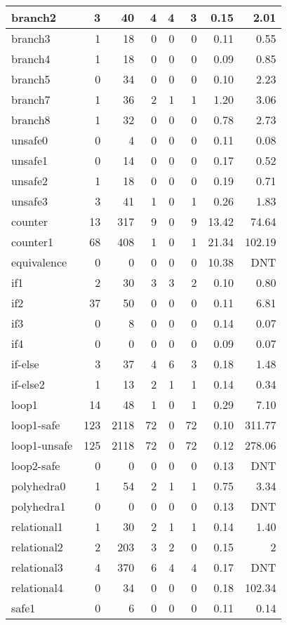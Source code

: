 \documentclass{article}
\begin{document}
\begin{table}[!b]
\begin{center}
{\begin{tabular}{l|r|r|r|r|r|r|r}
  branch2&3&40&4&4&3&0.15 & 2.01
  \\ \hline 
  branch3&1&18&0&0&0&0.11 & 0.55
  \\ \hline 
  branch4&1&18&0&0&0&0.09 & 0.85
  \\ \hline 
  branch5&0&34&0&0&0&0.10 & 2.23
  \\ \hline 
  branch7&1&36&2&1&1&1.20 & 3.06
  \\ \hline 
  branch8&1&32&0&0&0&0.78 & 2.73
  \\ \hline 
  unsafe0&0&4&0&0&0&0.11 & 0.08
  \\ \hline 
  unsafe1&0&14&0&0&0&0.17 & 0.52
  \\ \hline 
  unsafe2&1&18&0&0&0&0.19 & 0.71
  \\ \hline 
  unsafe3&3&41&1&0&1&0.26 & 1.83
  \\ \hline 
  counter&13&317&9&0&9&13.42 & 74.64
  \\ \hline 
  counter1&68&408&1&0&1&21.34 & 102.19
  \\ \hline 
  equivalence&0&0&0&0&0&10.38 & DNT
  \\ \hline 
  if1&2&30&3&3&2&0.10 & 0.80
  \\ \hline 
  if2&37&50&0&0&0&0.11 & 6.81
  \\ \hline 
  if3&0&8&0&0&0&0.14 & 0.07
  \\ \hline 
  if4&0&0&0&0&0&0.09 & 0.07
  \\ \hline 
  if-else&3&37&4&6&3& 0.18 & 1.48
  \\ \hline 
  if-else2&1&13&2&1&1& 0.14 & 0.34
  \\ \hline 
  loop1&14&48&1&0&1& 0.29  & 7.10
  \\ \hline 
  loop1-safe&123&2118&72&0&72& 0.10 & 311.77
  \\ \hline 
  loop1-unsafe&125&2118&72&0&72& 0.12 & 278.06
  \\ \hline 
  loop2-safe&0&0&0&0&0& 0.13 & DNT
  \\ \hline 
  polyhedra0&1&54&2&1&1& 0.75 & 3.34
  \\ \hline 
  polyhedra1&0&0&0&0&0& 0.13 & DNT
  \\ \hline 
  relational1&1&30&2&1&1& 0.14 & 1.40
  \\ \hline 
  relational2&2&203&3&2 & 0 & 0.15 & 2
  \\ \hline 
  relational3&4&370&6&4&4& 0.17 & DNT
  \\ \hline 
  relational4&0&34&0&0&0& 0.18 & 102.34
  \\ \hline 
  safe1&0&6&0&0&0& 0.11 & 0.14
  \\ \hline 

\end{tabular}}
\end{center}
\end{table}
\end{document}
